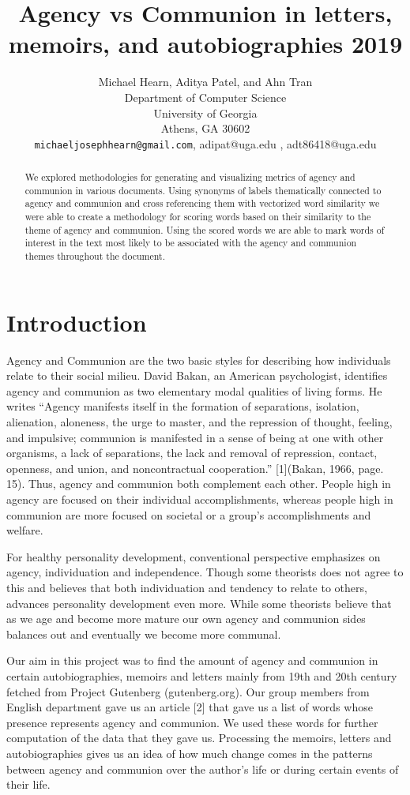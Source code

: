 \documentclass{article}
\title{Agency vs Communion in letters, memoirs, and autobiographies  2019}
\author{%
  Michael Hearn, Aditya Patel, and  Ahn Tran\\ %
  Department of Computer Science\\
  University of Georgia\\
  Athens, GA 30602 \\
  \texttt{michaeljosephhearn@gmail.com}, {adipat@uga.edu} , {adt86418@uga.edu}\\
}
\begin{document}
\maketitle

\begin{abstract}
   We explored methodologies for generating and visualizing metrics of agency and communion in various documents.
   Using synonyms of labels thematically connected to agency and communion and cross referencing them with vectorized word similarity we were able to create a methodology for scoring words based on their similarity to the theme of agency and communion. Using the scored words we are able to mark words of interest in the text most likely to be associated with the agency and communion themes throughout the document.
    
\end{abstract}

\section{Introduction}

Agency and Communion are the two basic styles for describing how individuals relate to their social milieu. David Bakan, an American psychologist, identifies agency and communion as two elementary modal qualities of living forms. He writes “Agency manifests itself in the formation of separations, isolation, alienation, aloneness, the urge to master, and the repression of thought, feeling, and impulsive; communion is manifested in a sense of being at one with other organisms, a lack of separations, the lack and removal of repression, contact, openness, and union, and noncontractual cooperation.” [1](Bakan, 1966, page. 15). Thus, agency and communion both complement each other. People high in agency are focused on their individual accomplishments, whereas people high in communion are more focused on societal or a group’s accomplishments and welfare.

For healthy personality development, conventional perspective emphasizes on agency, individuation and independence. Though some theorists does not agree to this and believes that both individuation and tendency to relate to others, advances personality development even more. While some theorists believe that as we age and become more mature our own agency and communion sides balances out and eventually we become more communal.

Our aim in this project was to find the amount of agency and communion in certain autobiographies, memoirs and letters mainly from 19th and 20th century fetched from Project Gutenberg (gutenberg.org). Our group members from English department gave us an article [2] that gave us a list of words whose presence represents agency and communion. We used these words for further computation of the data that they gave us. Processing the memoirs, letters and autobiographies gives us an idea of how much change comes in the patterns between agency and communion over the author's life or during certain events of their life.
\end{document}
